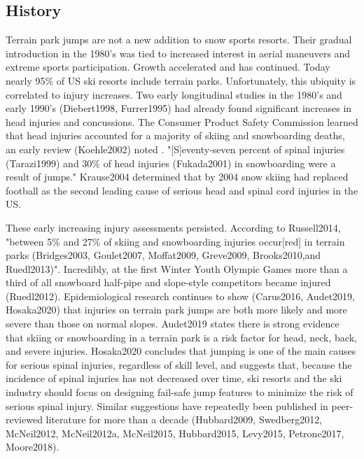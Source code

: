 \documentclass{article}
\begin{document}
\subsection{History}
%
Terrain park jumps are not a new addition to snow sports resorts. Their gradual 
introduction in the 1980's was tied to increased interest in aerial maneuvers 
and extreme sports participation. Growth accelerated and has continued.
Today nearly 95\% of US ski resorts include terrain parks. Unfortunately,
this ubiquity is correlated to injury increases.  Two early longitudinal studies  
in the 1980's and early 1990's (Diebert1998, Furrer1995) had already found significant 
increases in head injuries and concussions. The Consumer Product Safety Commission 
learned that head injuries accounted for a majority of skiing and 
snowboarding deaths, an early review (Koehle2002) noted . "[S]eventy-seven percent 
of spinal injuries (Tarazi1999) and 30\% of head injuries (Fukada2001) in 
snowboarding were a result of jumps." Krause2004 %
determined that by 2004 snow skiing had replaced football as the second leading 
cause of serious head and spinal cord injuries in the US. 

These early increasing injury assessments persisted. According to Russell2014, "between 
5\% and 27\% of skiing and snowboarding injuries occur[red] in terrain parks 
(Bridges2003, Goulet2007,  Moffat2009, Greve2009, Brooks2010,and Ruedl2013)". 
Incredibly, at the first Winter Youth Olympic Games more than a third of all 
snowboard half-pipe and slope-style competitors became injured (Ruedl2012). 
Epidemiological research continues to show (Carus2016, Audet2019, Hosaka2020) 
that injuries on terrain park jumps are both more likely and more severe than 
those on normal slopes.  Audet2019 states  there is strong evidence that skiing 
or snowboarding in a terrain park is a risk factor for head, neck, back, and 
severe injuries. Hosaka2020 concludes that jumping is one of the main causes 
for serious spinal injuries, regardless of skill level, and suggests that, 
because the incidence of spinal injuries has not decreased over time, ski resorts 
and the ski industry should focus on designing fail-safe jump features to minimize 
the risk of serious spinal injury.  Similar suggestions have repeatedly been published 
in peer-reviewed literature for more than a decade (Hubbard2009, Swedberg2012, McNeil2012, 
McNeil2012a, McNeil2015, Hubbard2015, Levy2015, Petrone2017, Moore2018).  
\end{document}
